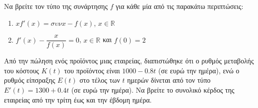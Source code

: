 \documentclass{../presentation}
\begin{document}
\begin{askisi}
  Να βρείτε τον τύπο της συνάρτησης $f$ για κάθε μία από τις παρακάτω περιπτώσεις:
  \begin{enumerate}[<+->]
    \item $xf'(x)=συνx-f(x)$, $x\in\mathbb{R}$
    \item $f'(x)-\dfrac{x}{f(x)}=0$, $x\in\mathbb{R}$ και $f(0)=2$
  \end{enumerate}
\end{askisi}

\begin{askisi}
  Από την πώληση ενός προϊόντος μιας εταιρείας, διαπιστώθηκε ότι ο ρυθμός μεταβολής του κόστους $Κ(t)$ του προϊόντος είναι $1000-0.8t$ (σε ευρώ την ημέρα), ενώ ο ρυθμός είπσραξης $Ε(t)$ στο τέλος των $t$ ημερών δίνεται από τον τύπο $Ε'(t)=1300+0.4t$ (σε ευρώ την ημέρα). Να βρείτε το συνολικό κέρδος της εταιρείας από την τρίτη έως και την έβδομη ημέρα.
\end{askisi}
\end{document}
